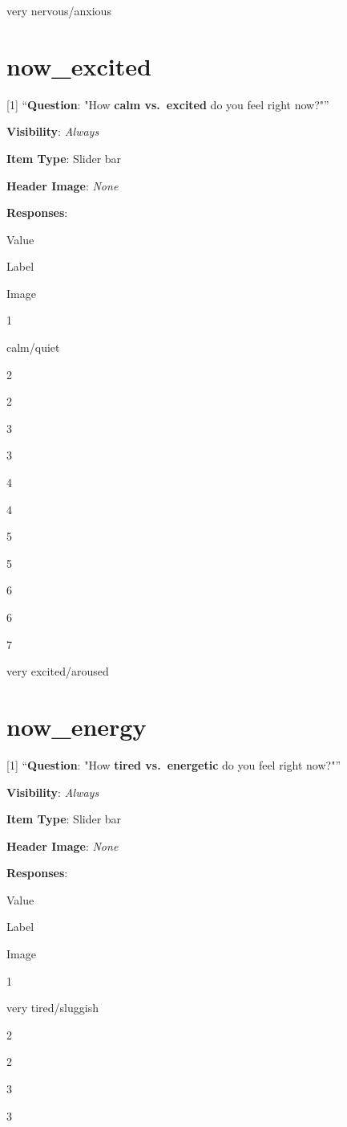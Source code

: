 \documentclass[]{book}
\begin{document}
very nervous/anxious

\hypertarget{now_excited}{%
\section{now\_excited}\label{now_excited}}

{[}1{]} ``\textbf{Question}: "How \textbf{calm vs.~excited} do you feel right now?"''

\textbf{Visibility}: \emph{Always}

\textbf{Item Type}: Slider bar

\textbf{Header Image}: \emph{None}

\textbf{Responses}:

Value

Label

Image

1

calm/quiet

2

2

3

3

4

4

5

5

6

6

7

very excited/aroused

\hypertarget{now_energy}{%
\section{now\_energy}\label{now_energy}}

{[}1{]} ``\textbf{Question}: "How \textbf{tired vs.~energetic} do you feel right now?"''

\textbf{Visibility}: \emph{Always}

\textbf{Item Type}: Slider bar

\textbf{Header Image}: \emph{None}

\textbf{Responses}:

Value

Label

Image

1

very tired/sluggish

2

2

3

3
\end{document}
